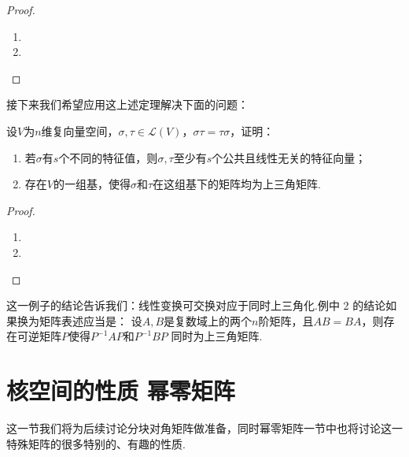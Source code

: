 \begin{proof}
    \begin{enumerate}[label=(\arabic*)]
        \item 
        \item 
    \end{enumerate}
\end{proof}

接下来我们希望应用这上述定理解决下面的问题：
\begin{example}
    设$V$为$n$维复向量空间，$\sigma,\tau\in \mathcal{L}(V)$，$\sigma\tau=\tau\sigma$，证明：
    \begin{enumerate}[label=(\arabic*)]
        \item 若$\sigma$有$s$个不同的特征值，则$\sigma,\tau$至少有$s$个公共且线性无关的特征向量；

        \item 存在$V$的一组基，使得$\sigma$和$\tau$在这组基下的矩阵均为上三角矩阵.
    \end{enumerate}
\end{example}
\begin{proof}
    \begin{enumerate}[label=(\arabic*)]
        \item 
        \item 
    \end{enumerate}
\end{proof}

这一例子的结论告诉我们：线性变换可交换对应于同时上三角化.例中 2 的结论如果换为矩阵表述应当是：
设$A,B$是复数域上的两个$n$阶矩阵，且$AB=BA$，则存在可逆矩阵$P$使得$P^{-1}AP$和$P^{-1}BP$
同时为上三角矩阵.

\section{核空间的性质 \quad 幂零矩阵}
这一节我们将为后续讨论分块对角矩阵做准备，同时幂零矩阵一节中也将讨论这一特殊矩阵的很多特别的、有趣的性质.

